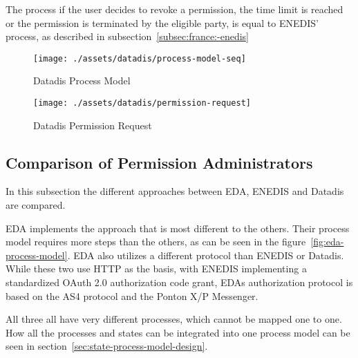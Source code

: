 The process if the user decides to revoke a permission, the time limit is reached or the permission is terminated by the eligible party, is equal to ENEDIS' process, as described in subsection\ \ref{subsec:france:-enedis}

\begin{figure}[h]
    \texttt{[image: ./assets/datadis/process-model-seq]}
    \caption{Datadis Process Model}
    \label{fig:datadis-process-model}
\end{figure}

\begin{figure}[h]
    \texttt{[image: ./assets/datadis/permission-request]}
    \caption{Datadis Permission Request}
    \label{fig:datadis-permission-request}
\end{figure}

\subsection{Comparison of Permission Administrators}\label{subsec:comparison-of-permission-administrators}
In this subsection the different approaches between EDA, ENEDIS and Datadis are compared.

EDA implements the approach that is most different to the others.
Their process model requires more steps than the others, as can be seen in the figure\ \ref{fig:eda-process-model}.
EDA also utilizes a different protocol than ENEDIS or Datadis.
While these two use HTTP as the basis, with ENEDIS implementing a standardized OAuth 2.0 authorization code grant, EDAs authorization protocol is based on the AS4 protocol and the Ponton X/P Messenger.

All three all have very different processes, which cannot be mapped one to one.
How all the processes and states can be integrated into one process model can be seen in section\ \ref{sec:state-process-model-design}.
